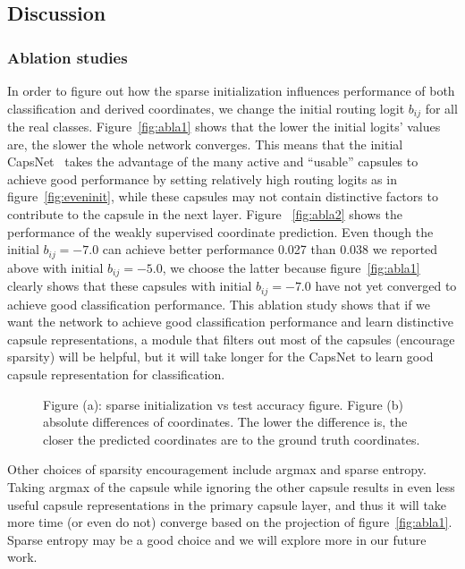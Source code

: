 \documentclass{article}
\begin{document}
\subsection{Discussion \label{sec:fail}}
\subsubsection{Ablation studies}\label{sec:ablation}
In order to figure out how the sparse initialization influences performance of both classification and derived coordinates, we change the initial routing logit $b_{ij}$ for all the real classes. Figure~\ref{fig:abla1} shows that the lower the initial logits' values are, the slower the whole network converges. This means that the initial CapsNet~\cite{sabour2017dynamic} takes the advantage of the many active and ``usable'' capsules to achieve good performance by setting relatively high routing logits as in figure~\ref{fig:eveninit}, while these capsules may not contain distinctive factors to contribute to the capsule in the next layer. Figure ~\ref{fig:abla2} shows the performance of the weakly supervised coordinate prediction. Even though the initial $b_{ij}=-7.0$ can achieve better performance 0.027 than 0.038 we reported above with initial $b_{ij}=-5.0$, we choose the latter because figure~\ref{fig:abla1} clearly shows that these capsules with initial $b_{ij}=-7.0$ have not yet converged to achieve good classification performance. This ablation study shows that if we want the network to achieve good classification performance and learn distinctive capsule representations, a module that filters out most of the capsules (encourage sparsity) will be helpful, but it will take longer for the CapsNet to learn good capsule representation for classification. 

\begin{figure}
\centering
{}
\caption{Figure (a): sparse initialization vs test accuracy figure. Figure (b) absolute differences of coordinates. The lower the difference is, the closer the predicted coordinates are to the ground truth coordinates. }
\end{figure}

Other choices of sparsity encouragement include argmax and sparse entropy. Taking argmax of the capsule while ignoring the other capsule results in even less useful capsule representations in the primary capsule layer, and thus it will take more time (or even do not) converge based on the projection of figure~\ref{fig:abla1}. Sparse entropy may be a good choice and we will explore more in our future work.
\end{document}
